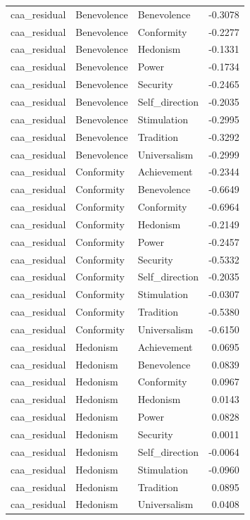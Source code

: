 \begin{tabular}{lllr}
caa\_residual & Benevolence & Benevolence & -0.3078 \\
caa\_residual & Benevolence & Conformity & -0.2277 \\
caa\_residual & Benevolence & Hedonism & -0.1331 \\
caa\_residual & Benevolence & Power & -0.1734 \\
caa\_residual & Benevolence & Security & -0.2465 \\
caa\_residual & Benevolence & Self\_direction & -0.2035 \\
caa\_residual & Benevolence & Stimulation & -0.2995 \\
caa\_residual & Benevolence & Tradition & -0.3292 \\
caa\_residual & Benevolence & Universalism & -0.2999 \\
caa\_residual & Conformity & Achievement & -0.2344 \\
caa\_residual & Conformity & Benevolence & -0.6649 \\
caa\_residual & Conformity & Conformity & -0.6964 \\
caa\_residual & Conformity & Hedonism & -0.2149 \\
caa\_residual & Conformity & Power & -0.2457 \\
caa\_residual & Conformity & Security & -0.5332 \\
caa\_residual & Conformity & Self\_direction & -0.2035 \\
caa\_residual & Conformity & Stimulation & -0.0307 \\
caa\_residual & Conformity & Tradition & -0.5380 \\
caa\_residual & Conformity & Universalism & -0.6150 \\
caa\_residual & Hedonism & Achievement & 0.0695 \\
caa\_residual & Hedonism & Benevolence & 0.0839 \\
caa\_residual & Hedonism & Conformity & 0.0967 \\
caa\_residual & Hedonism & Hedonism & 0.0143 \\
caa\_residual & Hedonism & Power & 0.0828 \\
caa\_residual & Hedonism & Security & 0.0011 \\
caa\_residual & Hedonism & Self\_direction & -0.0064 \\
caa\_residual & Hedonism & Stimulation & -0.0960 \\
caa\_residual & Hedonism & Tradition & 0.0895 \\
caa\_residual & Hedonism & Universalism & 0.0408 \\

\end{tabular}
